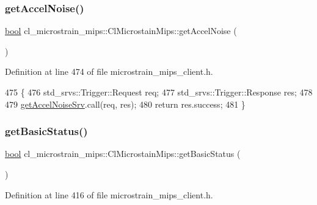 \subsubsection{\texorpdfstring{get\+Accel\+Noise()}{getAccelNoise()}}
{\footnotesize\ttfamily \hyperlink{classbool}{bool} cl\+\_\+microstrain\+\_\+mips\+::\+Cl\+Microstain\+Mips\+::get\+Accel\+Noise (\begin{DoxyParamCaption}{ }\end{DoxyParamCaption})\hspace{0.3cm}{\ttfamily [inline]}}



Definition at line 474 of file microstrain\+\_\+mips\+\_\+client.\+h.


\begin{DoxyCode}
475     \{
476         std\_srvs::Trigger::Request req;
477         std\_srvs::Trigger::Response res;
478 
479         \hyperlink{classcl__microstrain__mips_1_1ClMicrostainMips_ae34d6cfd5e2e990d2fa3afab20ca9c01}{getAccelNoiseSrv}.call(req, res);
480         \textcolor{keywordflow}{return} res.success;
481     \}
\end{DoxyCode}
\mbox{\label{classcl__microstrain__mips_1_1ClMicrostainMips_a7ba22bfed70ee5796d9776b9438d0908}} 
\subsubsection{\texorpdfstring{get\+Basic\+Status()}{getBasicStatus()}}
{\footnotesize\ttfamily \hyperlink{classbool}{bool} cl\+\_\+microstrain\+\_\+mips\+::\+Cl\+Microstain\+Mips\+::get\+Basic\+Status (\begin{DoxyParamCaption}{ }\end{DoxyParamCaption})\hspace{0.3cm}{\ttfamily [inline]}}



Definition at line 416 of file microstrain\+\_\+mips\+\_\+client.\+h.


